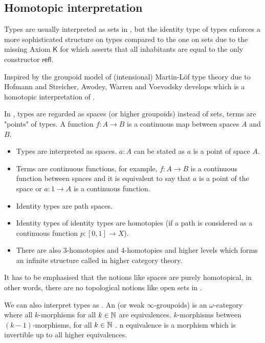 \subsection{Homotopic interpretation}

Types are usually interpreted as sets in \mltt, but the identity type of types enforces a more sophisticated structure on types compared to the one on sets due to the missing Axiom $\mathsf{K}$ for which asserts that all inhabitants are equal to the only constructor $\mathsf{refl}$. 

Inspired by the groupoid model of (intensional) Martin-Löf type theory due to Hofmann and Streicher, Awodey, Warren \cite{awodey-warren} and Voevodsky \cite{VV} develops \hott which is a homotopic interpretation of \mltt.

In \hott, types are regarded as spaces (or higher groupoids) instead of sets, terms are "points" of types. A function $f : A \to B$ is a continuous map between spaces $A$ and $B$.

\begin{itemize}
\item Types are interpreted as spaces. $a : A$ can be stated as $a$ is
  a point of space $A$.
\item Terms are continuous functions, for example, $f : A \rightarrow B$ is a
  continuous function between spaces and it is equivalent to say that $a$ is
  a point of the space or $a : 1 \rightarrow A$ is a continuous function.
\item Identity types are path spaces.
\item Identity types of identity types are homotopies (if a path is considered as a continuous function $p : [0,1] \rightarrow X$).
\item There are also 3-homotopies and 4-homotopies and higher
  levels which forms an infinite structure called \og in higher category theory.
\end{itemize}

\begin{remark}
It has to be emphasised that the notions like spaces are purely homotopical, in other words, there are no topological notions like open sets in \hott. 
\end{remark}


We can also interpret types as \textbf{\og}. 
An \ogs (or weak $\infty$-groupoids) is an $\omega$-category where all $k$-morphisms for all $k \in \mathbb{N}$ are equivalences. $k$-morphisms between $(k - 1)$-morphisms, for all $k \in \mathbb{N}$ . n equivalence is a morphism which is invertible up to all higher equivalences. 

